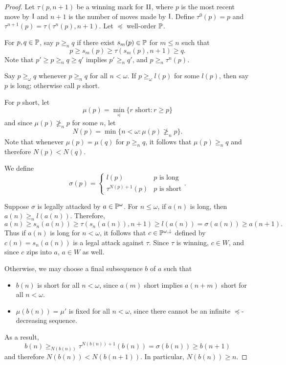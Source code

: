 \documentclass[11pt]{article}
\theoremstyle{plain}
\theoremstyle{definition}
\theoremstyle{remark}
\theoremstyle{plain}
\theoremstyle{definition}
\theoremstyle{remark}
\begin{document}
  \begin{proof}
    Let \(\tau(p,n+1)\) be a winning mark for \(\mathrm{II}\), where \(p\)
    is the most recent move by \(\mathrm{I}\) and \(n+1\)
    is the number of moves made by \(\mathrm{I}\).
    Define \(\tau^0(p)=p\) and \(\tau^{n+1}(p)=\tau(\tau^n(p),n+1)\).
    Let \(\preceq\) well-order \(\mathbb{P}\).

    For \(p,q\in \mathbb{P}\), say \(p\geq_n q\) if there exist
    \(s_m(p)\in\mathbb{P}\) for \(m\leq n\)
    such that
    \[
      p
    \geq
      s_m(p)
    \geq
      \tau(s_m(p),n+1)
    \geq
      q
    .\]
    Note that \(p'\geq p\geq_n q\geq q'\) implies \(p'\geq_n q'\),
    and \(p\geq_n \tau^n(p)\).

    Say \(p\geq_\omega q\) whenever \(p\geq_n q\) for all \(n<\omega\).
    If \(p\geq_\omega l(p)\) for some \(l(p)\), then say \(p\) is long;
    otherwise call \(p\) short.

    For \(p\) short, let
    \[
      \mu(p)
        =
      \min_{\preceq}\{
        r\text{ short}
          :
        r\geq p
      \}
    \]
    and since \(\mu(p)\not\geq_n p\) for some \(n\), let
    \[
      N(p)
        =
      \min\{
        n<\omega
      :
        \mu(p)\not\geq_n p
      \}
    .\]
    Note that whenever \(\mu(p)=\mu(q)\) for \(p\geq_n q\),
    it follows that \(\mu(p)\geq_n q\) and therefore \(N(p)<N(q)\).

    We define
    \[
      \sigma( p)
        =
      \begin{cases}
        l(p) & p \text{ is long} \\
        \tau^{N(p)+1}( p) &  p \text{ is short}
     \end{cases}
    .\]

    Suppose \(\sigma\) is legally attacked by \(a\in\mathbb{P}^\omega\).
    For \(n\leq\omega\), if \(a(n)\) is long, then \(a(n)\geq_n l(a(n))\).
    Therefore,
    \[
      a(n)
        \geq
      s_n(a(n))
        \geq
      \tau(s_n(a(n)),n+1)
        \geq
      l(a(n))
        =
      \sigma(a(n))
        \geq
      a(n+1)
    .\]
    Thus if \(a(n)\) is long for \(n<\omega\), it follows that
    \(c\in\mathbb{P}^{\omega,\downarrow}\) defined by \(c(n)=s_n(a(n))\)
    is a legal attack against \(\tau\). Since \(\tau\) is winning,
    \(c\in W\), and since \(c\) zips into \(a\),
    \(a\in W\) as well.

    Otherwise, we may choose a final subsequence \(b\) of \(a\) such that
      \begin{itemize}
        \item \(b(n)\) is short for all \(n<\omega\),
              since \(a(m)\) short implies \(a(n+m)\) short for all
              \(n<\omega\).
        \item \(\mu(b(n))=\mu'\) is fixed for all \(n<\omega\), since
              there cannot be an infinite \(\preceq\)-decreasing sequence.
      \end{itemize}
    As a result,
    \[
      b(n)
        \geq_{N(b(n))}
      \tau^{N(b(n))+1}(b(n))
        =
      \sigma(b(n))
        \geq
      b(n+1)
    \]
    and therefore \(N(b(n))<N(b(n+1))\). In particular, \(N(b(n))\geq n\).


\end{proof}
\end{document}
